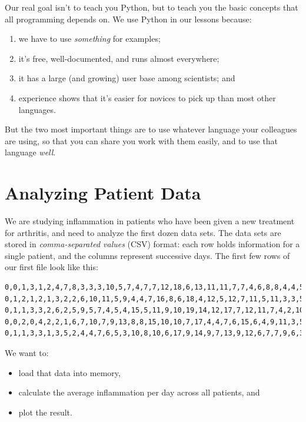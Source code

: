 \documentclass[]{book}
\newcommand{\gdef}[2]{\emph{#2}}
\begin{document}
Our real goal isn't to teach you Python, but to teach you the basic
concepts that all programming depends on. We use Python in our lessons
because:

\begin{enumerate}
\item
  we have to use \emph{something} for examples;
\item
  it's free, well-documented, and runs almost everywhere;
\item
  it has a large (and growing) user base among scientists; and
\item
  experience shows that it's easier for novices to pick up than most
  other languages.
\end{enumerate}

But the two most important things are to use whatever language your
colleagues are using, so that you can share you work with them easily,
and to use that language \emph{well}.

\section{Analyzing Patient Data}

We are studying inflammation in patients who have been given a new
treatment for arthritis, and need to analyze the first dozen data sets.
The data sets are stored in \gdef{g:csv}{comma-separated values}
(CSV) format: each row holds information for a single patient, and the
columns represent successive days. The first few rows of our first file
look like this:

\begin{verbatim}
0,0,1,3,1,2,4,7,8,3,3,3,10,5,7,4,7,7,12,18,6,13,11,11,7,7,4,6,8,8,4,4,5,7,3,4,2,3,0,0
0,1,2,1,2,1,3,2,2,6,10,11,5,9,4,4,7,16,8,6,18,4,12,5,12,7,11,5,11,3,3,5,4,4,5,5,1,1,0,1
0,1,1,3,3,2,6,2,5,9,5,7,4,5,4,15,5,11,9,10,19,14,12,17,7,12,11,7,4,2,10,5,4,2,2,3,2,2,1,1
0,0,2,0,4,2,2,1,6,7,10,7,9,13,8,8,15,10,10,7,17,4,4,7,6,15,6,4,9,11,3,5,6,3,3,4,2,3,2,1
0,1,1,3,3,1,3,5,2,4,4,7,6,5,3,10,8,10,6,17,9,14,9,7,13,9,12,6,7,7,9,6,3,2,2,4,2,0,1,1
\end{verbatim}

We want to:

\begin{itemize}
\item
  load that data into memory,
\item
  calculate the average inflammation per day across all patients, and
\item
  plot the result.
\end{itemize}
\end{document}
